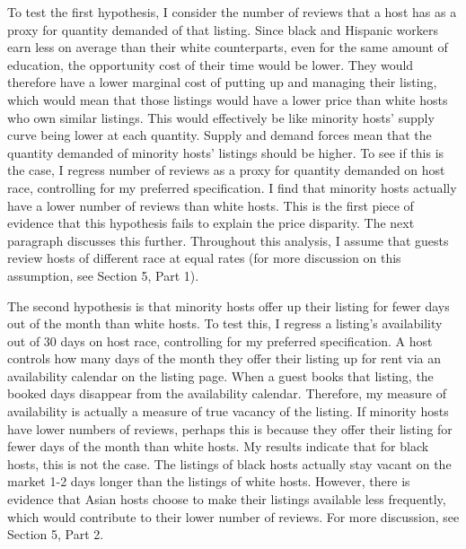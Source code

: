 \documentclass[11pt, oneside]{article}
\begin{document}
To test the first hypothesis, I consider the number of reviews that a host has as a proxy for quantity demanded of that listing. Since black and Hispanic workers earn less on average than their white counterparts, even for the same amount of education, the opportunity cost of their time would be lower.\cite{Economic Policy Institute, State of Working America Data Library, ?Wages by education,? 2016.} They would therefore have a lower marginal cost of putting up and managing their listing, which would mean that those listings would have a lower price than white hosts who own similar listings. This would effectively be like minority hosts' supply curve being lower at each quantity. Supply and demand forces mean that the quantity demanded of minority hosts' listings should be higher. To see if this is the case, I regress number of reviews as a proxy for quantity demanded on host race, controlling for my preferred specification. I find that minority hosts actually have a lower number of reviews than white hosts. This is the first piece of evidence that this hypothesis fails to explain the price disparity. The next paragraph discusses this further. Throughout this analysis, I assume that guests review hosts of different race at equal rates (for more discussion on this assumption, see Section 5, Part 1). 

The second hypothesis is that  minority hosts offer up their listing for fewer days out of the month than white hosts. To test this, I regress a listing's availability out of 30 days on host race, controlling for my preferred specification. A host controls how many days of the month they offer their listing up for rent via an availability calendar on the listing page. When a guest books that listing, the booked days disappear from the availability calendar. Therefore, my measure of availability is actually a measure of true vacancy of the listing. If minority hosts have lower numbers of reviews, perhaps this is because they offer their listing for fewer days of the month than white hosts. My results indicate that for black hosts, this is not the case. The listings of black hosts actually stay vacant on the market 1-2 days longer than the listings of white hosts. However, there is evidence that Asian hosts choose to make their listings available less frequently, which would contribute to their lower number of reviews. For more discussion, see Section 5, Part 2.      
\end{document}
